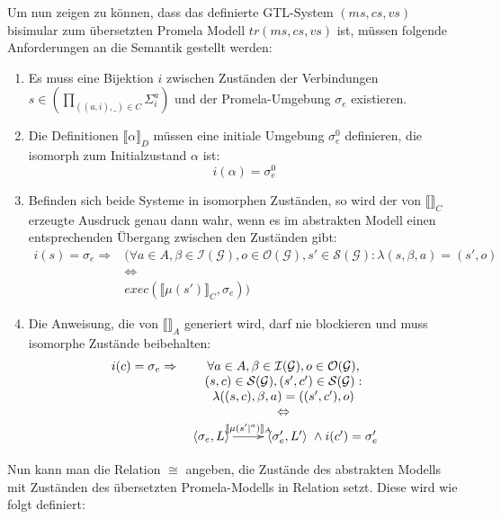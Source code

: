Um nun zeigen zu können, dass das definierte GTL-System $(ms,cs,vs)$ bisimular zum übersetzten Promela Modell $tr(ms,cs,vs)$ ist, müssen folgende Anforderungen an die Semantik gestellt werden:
\begin{enumerate}
\item Es muss eine Bijektion $i$ zwischen Zuständen der Verbindungen $s\in\left(\prod_{((a,i),\_)\in C} \Sigma^a_i\right)$ und der Promela-Umgebung $\sigma_e$ existieren.
\item Die Definitionen $\llbracket \alpha \rrbracket_D$ müssen eine initiale Umgebung $\sigma_e^0$ definieren, die isomorph zum Initialzustand $\alpha$ ist: 
  \[ i(\alpha) = \sigma_e^0 \]
\item Befinden sich beide Systeme in isomorphen Zuständen, so wird der von $\llbracket \rrbracket_C$ erzeugte Ausdruck genau dann wahr, wenn es im abstrakten Modell einen entsprechenden Übergang zwischen den Zuständen gibt:
  \[ \begin{array}{rc}
    i(s) = \sigma_e \Rightarrow &
    (\forall a\in A,\beta\in\mathcal{I}(\mathcal{G}),o\in\mathcal{O}(\mathcal{G}),s'\in\mathcal{S}(\mathcal{G}): \lambda(s,\beta,a)=(s',o)\\
    & \Leftrightarrow\\
    & \mathit{exec}(\llbracket \mu(s')\rrbracket_C,\sigma_e))
  \end{array} \]
\item Die Anweisung, die von $\llbracket \rrbracket_A$ generiert wird, darf nie blockieren und muss isomorphe Zustände beibehalten:
  \[ \begin{array}{rc}
    i(c) = \sigma_e \Rightarrow &
    \forall a\in A,\beta\in\mathcal{I}(\mathcal{G}),o\in\mathcal{O}(\mathcal{G}),\\
    & (s,c)\in\mathcal{S}(\mathcal{G}),(s',c')\in\mathcal{S}(\mathcal{G}):\\
    & \lambda((s,c),\beta,a)=((s',c'),o)\\
    & \Leftrightarrow\\
    & \xymatrix { \left<\sigma_e,L\right> \ar[r]^-{\llbracket \mu(s'|^a)\rrbracket_A} & \left<\sigma_e',L'\right> } \land i(c') = \sigma_e'
  \end{array} \]
\end{enumerate}
Nun kann man die Relation $\cong$ angeben, die Zustände des abstrakten Modells mit Zuständen des übersetzten Promela-Modells in Relation setzt.
Diese wird wie folgt definiert:
